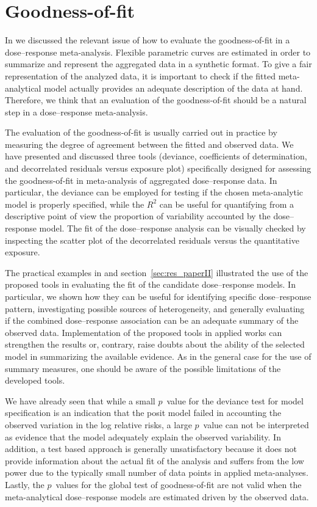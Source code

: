 \documentclass[11pt,a4paper,twoside,openany]{book}\usepackage{knitr}
\begin{document}
{\section{Goodness-of-fit}

In  we discussed the relevant issue of how to evaluate the goodness-of-fit in a dose--response meta-analysis. Flexible parametric curves are estimated in order to summarize and represent the aggregated data in a synthetic format. To give a fair representation of the analyzed data, it is important to check if the fitted meta-analytical model actually provides an adequate description of the data at hand. Therefore, we think that an evaluation of the goodness-of-fit should be a natural step in a dose--response meta-analysis.

The evaluation of the goodness-of-fit is usually carried out in practice by measuring the degree of agreement between the fitted and observed data. We have presented and discussed three tools (deviance, coefficients of determination, and decorrelated residuals versus exposure plot) specifically designed for assessing the goodness-of-fit in meta-analysis of aggregated dose--response data. In particular, the deviance can be employed for testing if the chosen meta-analytic model is properly specified, while the $R^2$ can be useful for quantifying from a descriptive point of view the proportion of variability accounted by the dose--response model. The fit of the dose--response analysis can be visually checked by inspecting the scatter plot of the decorrelated residuals versus the quantitative exposure.

The practical examples in  and section~\ref{sec:res_paperII} illustrated the use of the proposed tools in evaluating the fit of the candidate dose--response models. In particular, we shown how they can be useful for identifying specific dose--response pattern, investigating possible sources of heterogeneity, and generally evaluating if the combined dose--response association can be an adequate summary of the observed data. Implementation of the proposed tools in applied works can strengthen the results or, contrary, raise doubts about the ability of the selected model in summarizing the available evidence. As in the general case for the use of summary measures, one should be aware of the possible limitations of the developed tools.

\noindent We have already seen that while a small $p$~value for the deviance test for model specification is an indication that the posit model failed in accounting the observed variation in the log relative risks, a large $p$~value can not be interpreted as evidence that the model adequately explain the observed variability. In addition, a test based approach is generally unsatisfactory because it does not provide information about the actual fit of the analysis and suffers from the low power due to the typically small number of data points in applied meta-analyses. Lastly, the $p$~values for the global test of goodness-of-fit are not valid when the meta-analytical dose--response models are estimated driven by the observed data.

}
\end{document}
